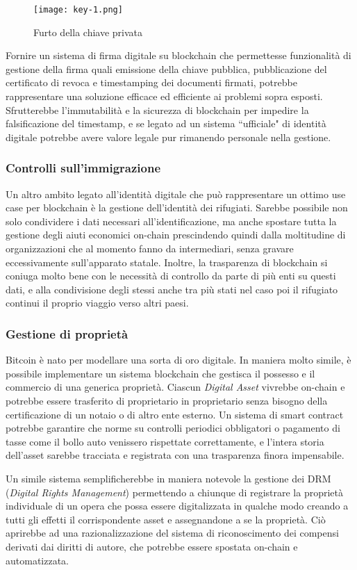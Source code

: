         	\begin{figure}[ht]
        		\centering
        		\texttt{[image: key-1.png]}
        		\caption{Furto della chiave privata \cite{ametrano_signature}}
        		\label{fig:key-1}
        	\end{figure}
        	
   			Fornire un sistema di firma digitale su blockchain che permettesse funzionalità di gestione della firma quali emissione della chiave pubblica, pubblicazione del certificato di revoca e timestamping dei documenti firmati, potrebbe rappresentare una soluzione efficace ed efficiente ai problemi sopra esposti. Sfrutterebbe l'immutabilità e la sicurezza di blockchain per impedire la falsificazione del timestamp, e se legato ad un sistema ``ufficiale" di identità digitale potrebbe avere valore legale pur rimanendo personale nella gestione.
   			
   		\subsubsection{Controlli sull'immigrazione}
   			Un altro ambito legato all'identità digitale che può rappresentare un ottimo use case per blockchain è la gestione dell'identità dei rifugiati. Sarebbe possibile non solo condividere i dati necessari all'identificazione, ma anche spostare tutta la gestione degli aiuti economici on-chain prescindendo quindi dalla moltitudine di organizzazioni che al momento fanno da intermediari, senza gravare eccessivamente sull'apparato statale. Inoltre, la trasparenza di blockchain si coniuga molto bene con le necessità di controllo da parte di più enti su questi dati, e alla condivisione degli stessi anche tra più stati nel caso poi il rifugiato continui il proprio viaggio verso altri paesi.
   			
   		\subsubsection{Gestione di proprietà}
   			Bitcoin è nato per modellare una sorta di oro digitale. In maniera molto simile, è possibile implementare un sistema blockchain che gestisca il possesso e il commercio di una generica proprietà. Ciascun \emph{Digital Asset} vivrebbe on-chain e potrebbe essere trasferito di proprietario in proprietario senza bisogno della certificazione di un notaio o di altro ente esterno. Un sistema di smart contract potrebbe garantire che norme su controlli periodici obbligatori o pagamento di tasse come il bollo auto venissero rispettate correttamente, e l'intera storia dell'asset sarebbe tracciata e registrata con una trasparenza finora impensabile.
   			
   			Un simile sistema semplificherebbe in maniera notevole la gestione dei DRM (\emph{Digital Rights Management}) permettendo a chiunque di registrare la proprietà individuale di un opera che possa essere digitalizzata in qualche modo creando a tutti gli effetti il corrispondente asset e assegnandone a se la proprietà. Ciò aprirebbe ad una razionalizzazione del sistema di riconoscimento dei compensi derivati dai diritti di autore, che potrebbe essere spostata on-chain e automatizzata.
